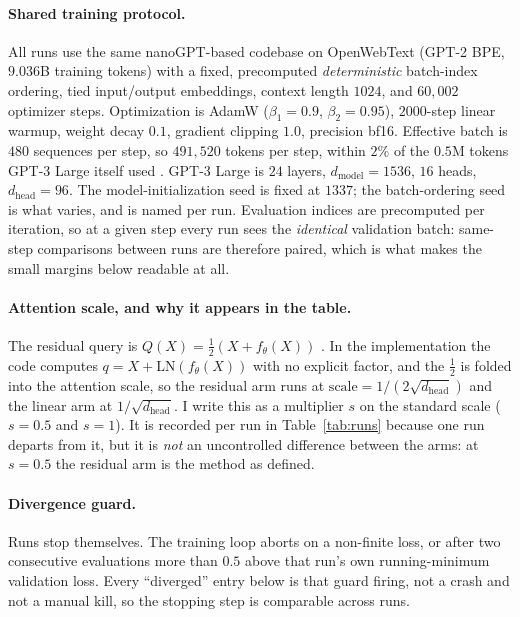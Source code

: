 \documentclass[mlabstract,onecolumn]{jmlr}
\begin{document}
\paragraph{Shared training protocol.} All runs use the same nanoGPT-based codebase on
OpenWebText (GPT-2 BPE, $9.036$B training tokens) with a fixed, precomputed
\emph{deterministic} batch-index ordering, tied input/output embeddings, context length
$1024$, and $60{,}002$ optimizer steps. Optimization is AdamW ($\beta_1=0.9$,
$\beta_2=0.95$), $2000$-step linear warmup, weight decay $0.1$, gradient clipping $1.0$,
precision bf16. Effective batch is $480$ sequences per step, so $491{,}520$ tokens per
step, within $2\%$ of the $0.5$M tokens GPT-3 Large itself used \citep{brown2020gpt3}.
GPT-3 Large is $24$ layers, $d_\text{model}=1536$, $16$ heads, $d_\text{head}=96$. The
model-initialization seed is fixed at $1337$; the batch-ordering seed is what varies, and
is named per run. Evaluation indices are precomputed per iteration, so at a given step
every run sees the \emph{identical} validation batch: same-step comparisons between runs
are therefore paired, which is what makes the small margins below readable at all.

\paragraph{Attention scale, and why it appears in the table.} The residual query is
$Q(X)=\tfrac{1}{2}(X+f_\theta(X))$ \citep{karbevski2026wkwv}. In the implementation the
code computes $q = X + \mathrm{LN}(f_\theta(X))$ with no explicit factor, and the
$\tfrac{1}{2}$ is folded into the attention scale, so the residual arm runs at
$\text{scale}=1/(2\sqrt{d_\text{head}})$ and the linear arm at $1/\sqrt{d_\text{head}}$.
I write this as a multiplier $s$ on the standard scale ($s=0.5$ and $s=1$). It is
recorded per run in Table~\ref{tab:runs} because one run departs from it, but it is
\emph{not} an uncontrolled difference between the arms: at $s=0.5$ the residual arm is
the method as defined.

\paragraph{Divergence guard.} Runs stop themselves. The training loop aborts on a
non-finite loss, or after two consecutive evaluations more than $0.5$ above that run's own
running-minimum validation loss. Every ``diverged'' entry below is that guard firing, not
a crash and not a manual kill, so the stopping step is comparable across runs.
\end{document}
